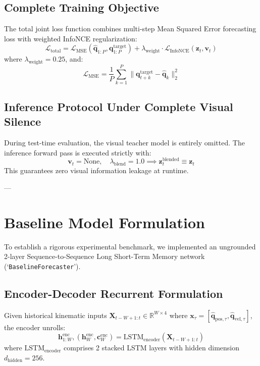 \documentclass[11pt,a4paper]{article}
\begin{document}
\subsection{Complete Training Objective}
The total joint loss function combines multi-step Mean Squared Error forecasting loss with weighted InfoNCE regularization:
\begin{equation}
    \mathcal{L}_{\text{total}} = \mathcal{L}_{\text{MSE}}(\hat{\mathbf{q}}_{1:P}, \mathbf{q}_{1:P}^{\text{target}}) + \lambda_{\text{weight}} \cdot \mathcal{L}_{\text{InfoNCE}}(\mathbf{z}_t, \mathbf{v}_t)
\end{equation}
where $\lambda_{\text{weight}} = 0.25$, and:
\begin{equation}
    \mathcal{L}_{\text{MSE}} = \frac{1}{P} \sum_{k=1}^P \|\mathbf{q}_{t+k}^{\text{target}} - \hat{\mathbf{q}}_k\|_2^2
\end{equation}

\subsection{Inference Protocol Under Complete Visual Silence}
During test-time evaluation, the visual teacher model is entirely omitted. The inference forward pass is executed strictly with:
\begin{equation}
    \mathbf{v}_t = \text{None}, \quad \lambda_{\text{blend}} = 1.0 \implies \mathbf{z}_t^{\text{blended}} \equiv \mathbf{z}_t
\end{equation}
This guarantees zero visual information leakage at runtime.

---

\section{Baseline Model Formulation}
\label{sec:baseline}

To establish a rigorous experimental benchmark, we implemented an ungrounded 2-layer Sequence-to-Sequence Long Short-Term Memory network (`\texttt{BaselineForecaster}').

\subsection{Encoder-Decoder Recurrent Formulation}
Given historical kinematic inputs $\mathbf{X}_{t-W+1:t} \in \mathbb{R}^{W \times 4}$ where $\mathbf{x}_\tau = [\hat{\mathbf{q}}_{\text{pos}, \tau}, \hat{\mathbf{q}}_{\text{vel}, \tau}]$, the encoder unrolls:
\begin{equation}
    \mathbf{h}_{1:W}^{\text{enc}}, (\mathbf{h}_W^{\text{enc}}, \mathbf{c}_W^{\text{enc}}) = \text{LSTM}_{\text{encoder}}(\mathbf{X}_{t-W+1:t})
\end{equation}
where $\text{LSTM}_{\text{encoder}}$ comprises 2 stacked LSTM layers with hidden dimension $d_{\text{hidden}} = 256$.
\end{document}
